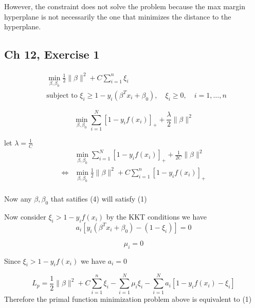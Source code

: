 \documentclass{article}
\begin{document}
However, the constraint does not solve the problem because the max margin hyperplane is not necessarily the one that minimizes the distance to the hyperplane.
\subsection{Ch 12, Exercise 1}

\begin{align}
&\underset{\beta, \beta_0}{\min} \frac{1}{2} \|\beta\|^2 + C \sum_{i=1}^n \xi_i \\
&\text{subject to } \xi_i \ge 1-y_i(\beta^T x_i + \beta_0), \quad \xi_i \geq 0, \quad i = 1, \ldots, n
\end{align}


\[
\underset{\beta, \beta_0}{\min} \sum_{i=1}^{N}[1-y_i f(x_i)]_+ + \frac{\lambda}{2} \|\beta\|^2
\]

let \(\lambda = \frac{1}{C}\)
\begin{align}
&\underset{\beta, \beta_0}{\min} \sum_{i=1}^{N}[1-y_i f(x_i)]_+ + \frac{1}{2C} \|\beta\|^2\\
\iff & \underset{\beta, \beta_0}{\min} \frac{1}{2} \|\beta\|^2 + C \sum_{i=1}^n [1-y_i f(x_i)]_+ \\
\end{align}

Now any \(\beta, \beta_0\) that satifies (4) will satisfy (1)

Now consider \(\xi_i > 1 - y_i f(x_i)\) by the KKT conditions we have
\[
a_i[y_i (\beta^T x_i + \beta_0) - (1- \xi_i)] = 0
\]

\[\mu_i = 0\]

Since \(\xi_i > 1 - y_i f(x_i)\) we have \(a_i = 0\)

\[
L_p = \frac{1}{2} \|\beta\|^2 + C \sum_{i=1}^n \xi_i - \sum_{i=1}^{N}\mu_i \xi_i - \sum_{i=1}^{N} a_i [1-y_i f(x_i) - \xi_i]
\]
Therefore the primal function minimization problem above is equivalent to (1)
\end{document}

